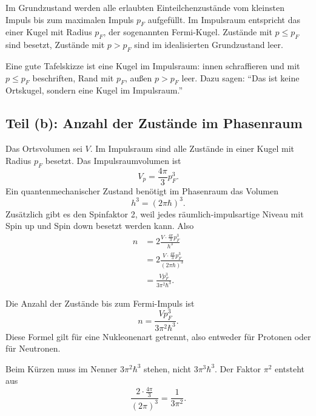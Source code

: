 \documentclass[11pt,a4paper]{scrartcl}
\theoremstyle{definition}
\theoremstyle{plain}
\theoremstyle{remark}
\begin{document}
\begin{solutionbox}
Im Grundzustand werden alle erlaubten Einteilchenzustände vom kleinsten Impuls bis zum maximalen Impuls \(p_F\) aufgefüllt. Im Impulsraum entspricht das einer Kugel mit Radius \(p_F\), der sogenannten Fermi-Kugel. Zustände mit \(p\le p_F\) sind besetzt, Zustände mit \(p>p_F\) sind im idealisierten Grundzustand leer.
\end{solutionbox}

\begin{talkbox}
Eine gute Tafelskizze ist eine Kugel im Impulsraum: innen schraffieren und mit \(p\le p_F\) beschriften, Rand mit \(p_F\), außen \(p>p_F\) leer. Dazu sagen: \enquote{Das ist keine Ortskugel, sondern eine Kugel im Impulsraum.}
\end{talkbox}

\subsection{Teil (b): Anzahl der Zustände im Phasenraum}

\begin{calculationbox}
Das Ortsvolumen sei \(V\). Im Impulsraum sind alle Zustände in einer Kugel mit Radius \(p_F\) besetzt. Das Impulsraumvolumen ist
\[
    V_p = \frac{4\pi}{3}p_F^3.
\]
Ein quantenmechanischer Zustand benötigt im Phasenraum das Volumen
\[
    h^3=(2\pi\hbar)^3.
\]
Zusätzlich gibt es den Spinfaktor 2, weil jedes räumlich-impulsartige Niveau mit Spin up und Spin down besetzt werden kann. Also
\begin{align*}
    n
    &= 2\frac{V\cdot \frac{4\pi}{3}p_F^3}{h^3} \\
    &= 2\frac{V\cdot \frac{4\pi}{3}p_F^3}{(2\pi\hbar)^3} \\
    &= \frac{V p_F^3}{3\pi^2\hbar^3}.
\end{align*}
\end{calculationbox}

\begin{answerbox}
Die Anzahl der Zustände bis zum Fermi-Impuls ist
\[
    \boxed{n=\frac{V p_F^3}{3\pi^2\hbar^3}}.
\]
Diese Formel gilt für eine Nukleonenart getrennt, also entweder für Protonen oder für Neutronen.
\end{answerbox}

\begin{warningbox}
Beim Kürzen muss im Nenner \(3\pi^2\hbar^3\) stehen, nicht \(3\pi^3\hbar^3\). Der Faktor \(\pi^2\) entsteht aus
\[
    \frac{2\cdot \frac{4\pi}{3}}{(2\pi)^3}=\frac{1}{3\pi^2}.
\]
\end{warningbox}
\end{document}

